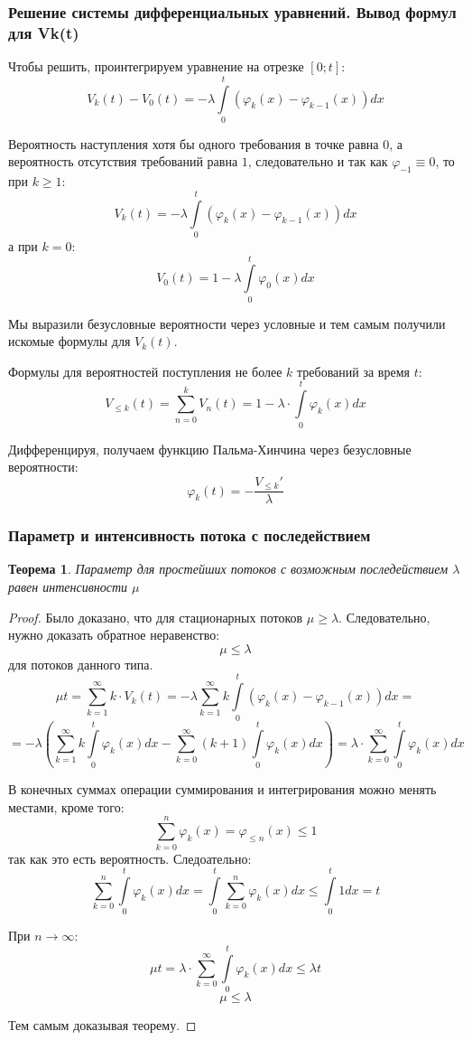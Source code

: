 \documentclass[aps,%
12pt,%
final,%
oneside,
onecolumn,%
musixtex, %
superscriptaddress,%
centertags]{article} %
\theoremstyle{plain}
\newtheorem{theorem}{Теорема}[section] %
\theoremstyle{definition}
\theoremstyle{remark}
\begin{document}
\subsubsection{Решение системы дифференциальных уравнений. Вывод формул для Vk(t)}

Чтобы решить, проинтегрируем уравнение на отрезке $[0;t]$:
$$V_k(t) - V_0(t) = -\lambda \int\limits_{0}^t (\varphi_k(x) - \varphi_{k-1}(x))dx$$

Вероятность наступления хотя бы одного требования в точке равна $0$, а вероятность отсутствия требований равна $1$, следовательно и так как $\varphi_{-1} \equiv 0$, то при $k \geq 1$:
$$V_k(t) = -\lambda \int\limits_{0}^t (\varphi_k(x) - \varphi_{k-1}(x))dx$$
а при $k=0$:
$$V_0(t) = 1 - \lambda \int\limits_{0}^t \varphi_0(x)dx$$

Мы выразили безусловные вероятности через условные и тем самым получили искомые формулы для $V_k(t)$.

Формулы для вероятностей поступления не более $k$ требований за время $t$:
$$V_{\leq k}(t) =  \sum\limits_{n=0}^k V_n(t) = 1 - \lambda \cdot \int\limits_0^t \varphi_k(x)dx$$

Дифференцируя, получаем функцию Пальма-Хинчина через безусловные вероятности:
$$\varphi_k(t) = - \frac{V_{\leq k}'}{\lambda}$$

\subsubsection{Параметр и интенсивность потока с последействием}

\begin{theorem}
	Параметр для простейших потоков с возможным последействием $\lambda$ равен интенсивности $\mu$ 
\end{theorem}
\begin{proof}
	Было доказано, что для стационарных потоков $\mu \geq \lambda$. Следовательно, нужно доказать обратное неравенство:
	$$\mu \leq \lambda$$
	для потоков данного типа.
	$$\mu t = \sum\limits_{k=1}^{\infty} k \cdot V_k(t) =  -\lambda  \sum\limits_{k=1}^{\infty} k \int\limits_{0}^t (\varphi_k(x) - \varphi_{k-1}(x))dx = $$
	$$=-\lambda \left(\sum\limits_{k=1}^{\infty} k \int\limits_0^t \varphi_k(x) dx - \sum\limits_{k=0}^{\infty} (k+1) \int\limits_0^t \varphi_{k}(x) dx\right) = \lambda \cdot \sum\limits_{k=0}^{\infty}\int\limits_{0}^t \varphi_k(x)dx$$

	В конечных суммах операции суммирования и интегрирования можно менять местами, кроме того:
	$$\sum\limits_{k=0}^n \varphi_k(x) = \varphi_{\leq n}(x) \leq 1$$
	так как это есть вероятность. Следоательно:
	$$ \sum\limits_{k=0}^{n}\int\limits_{0}^t \varphi_k(x)dx = \int\limits_{0}^{t}\sum\limits_{k=0}^{n} \varphi_k(x)dx \leq \int\limits_0^t 1dx = t $$

	При $n \to \infty$:
	$$\mu t = \lambda \cdot \sum\limits_{k=0}^{\infty}\int\limits_{0}^t \varphi_k(x)dx \leq \lambda t$$
	$$\mu \leq \lambda $$

	Тем самым доказывая теорему.
\end{proof}
\end{document}

